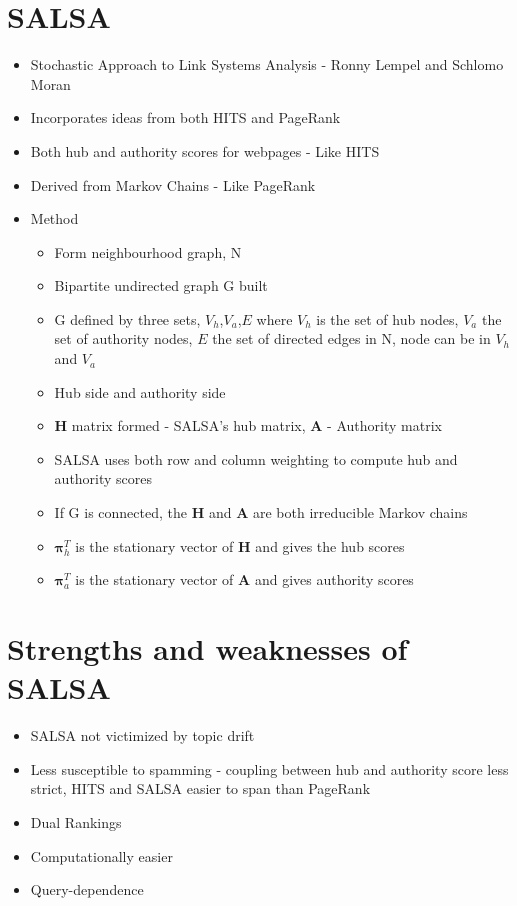 \documentclass[11pt]{report}
\begin{document}
\section{SALSA}
\begin{itemize}
\item Stochastic Approach to Link Systems Analysis - Ronny Lempel and Schlomo Moran
\item Incorporates ideas from both HITS and PageRank
\item Both hub and authority scores for webpages - Like HITS
\item Derived from Markov Chains - Like PageRank
\item Method
\begin{itemize}
\item Form neighbourhood graph, N
\item Bipartite undirected graph G built
\item G defined by three sets, $V_h$,$V_a$,$E$ where $V_h$ is the set of hub nodes, $V_a$ the set of authority nodes, $E$ the set of directed edges in N, node can be in $V_h$ and $V_a$
\item Hub side and authority side
\item \textbf{H} matrix formed - SALSA's hub matrix, \textbf{A} - Authority matrix
\item SALSA uses both row and column weighting to compute hub and authority scores
\item If G is connected, the \textbf{H} and \textbf{A} are both irreducible Markov chains
\item $\boldsymbol\pi_h^T$ is the stationary vector of \textbf{H} and gives the hub scores
\item $\boldsymbol\pi_a^T$ is the stationary vector of \textbf{A} and gives authority scores
\end{itemize}
\end{itemize}
\section{Strengths and weaknesses of SALSA}
\begin{itemize}
\item SALSA not victimized by topic drift
\item Less susceptible to spamming - coupling between hub and authority score less strict, HITS and SALSA easier to span than PageRank
\item Dual Rankings
\item Computationally easier
\item Query-dependence
\end{itemize}
\end{document}
